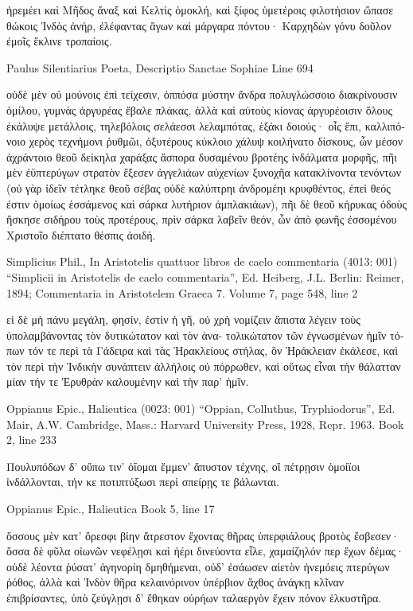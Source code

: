\documentclass[12pt,letterpaper,twoside,final]{memoir}
\begin{document}
\begin{greek}
ἠρεμέει καὶ Μῆδος ἄναξ καὶ Κελτὶς ὁμοκλή, 
καὶ ξίφος ὑμετέροις φιλοτήσιον ὤπασε θώκοις 
Ἰνδὸς ἀνήρ, ἐλέφαντας ἄγων καὶ μάργαρα πόντου· 
Καρχηδὼν γόνυ δοῦλον ἐμοῖς ἔκλινε τροπαίοις. 



Paulus Silentiarius Poeta, Descriptio Sanctae Sophiae 
Line 694

οὐδὲ μὲν οὐ μούνοις ἐπὶ τείχεσιν, ὁππόσα μύστην 
ἄνδρα πολυγλώσσοιο διακρίνουσιν ὁμίλου, 
γυμνὰς ἀργυρέας ἔβαλε πλάκας, ἀλλὰ καὶ αὐτοὺς 
κίονας ἀργυρέοισιν ὅλους ἐκάλυψε μετάλλοις, 
τηλεβόλοις σελάεσσι λελαμπότας, ἑξάκι δοιούς· 
οἷς ἔπι, καλλιπόνοιο χερὸς τεχνήμονι ῥυθμῶι, 
ὀξυτέρους κύκλοιο χάλυψ κοιλήνατο δίσκους, 
ὧν μέσον ἀχράντοιο θεοῦ δείκηλα χαράξας   
ἄσπορα δυσαμένου βροτέης ἰνδάλματα μορφῆς, 
πῆι μὲν ἐϋπτερύγων στρατὸν ἔξεσεν ἀγγελιάων 
αὐχενίων ξυνοχῆα κατακλίνοντα τενόντων 
(οὐ γὰρ ἰδεῖν τέτληκε θεοῦ σέβας οὐδὲ καλύπτρηι 
ἀνδρομέηι κρυφθέντος, ἐπεὶ θεός ἐστιν ὁμοίως 
ἑσσάμενος καὶ σάρκα λυτήριον ἀμπλακιάων), 
πῆι δὲ θεοῦ κήρυκας ὀδοὺς ἤσκησε σιδήρου 
τοὺς προτέρους, πρὶν σάρκα λαβεῖν θεόν, ὧν ἀπὸ φωνῆς 
ἐσσομένου Χριστοῖο διέπτατο θέσπις ἀοιδή. 



Simplicius Phil., In Aristotelis quattuor libros de caelo commentaria (4013: 001)
“Simplicii in Aristotelis de caelo commentaria”, Ed. Heiberg, J.L.
Berlin: Reimer, 1894; Commentaria in Aristotelem Graeca 7.
Volume 7, page 548, line 2

                εἰ δὲ μὴ πάνυ μεγάλη, φησίν, ἐστὶν ἡ γῆ, οὐ χρὴ 
νομίζειν ἄπιστα λέγειν τοὺς ὑπολαμβάνοντας τὸν δυτικώτατον καὶ τὸν ἀνα-  
τολικώτατον τῶν ἐγνωσμένων ἡμῖν τόπων τόν τε περὶ τὰ Γάδειρα καὶ τὰς 
Ἡρακλείους στήλας, ὃν Ἡράκλειαν ἐκάλεσε, καὶ τὸν περὶ τὴν Ἰνδικὴν 
συνάπτειν ἀλλήλοις οὐ πόρρωθεν, καὶ οὕτως εἶναι τὴν θάλατταν μίαν τήν 
τε Ἐρυθρὰν καλουμένην καὶ τὴν παρ' ἡμῖν. 



Oppianus Epic., Halieutica (0023: 001)
“Oppian, Colluthus, Tryphiodorus”, Ed. Mair, A.W.
Cambridge, Mass.: Harvard University Press, 1928, Repr. 1963.
Book 2, line 233

Πουλυπόδων δ' οὔπω τιν' ὀΐομαι ἔμμεν' ἄπυστον   
τέχνης, οἳ πέτρῃσιν ὁμοίϊοι ἰνδάλλονται, 
τήν κε ποτιπτύξωσι περὶ σπείρῃς τε βάλωνται. 



Oppianus Epic., Halieutica 
Book 5, line 17

ὅσσους μὲν κατ' ὄρεσφι βίην ἄτρεστον ἔχοντας 
θῆρας ὑπερφιάλους βροτὸς ἔσβεσεν· ὅσσα δὲ φῦλα 
οἰωνῶν νεφέλῃσι καὶ ἠέρι δινεύοντα 
εἷλε, χαμαίζηλόν περ ἔχων δέμας· οὐδὲ λέοντα 
ῥύσατ' ἀγηνορίη δμηθήμεναι, οὐδ' ἐσάωσεν   
αἰετὸν ἠνεμόεις πτερύγων ῥόθος, ἀλλὰ καὶ Ἰνδὸν 
θῆρα κελαινόρινον ὑπέρβιον ἄχθος ἀνάγκῃ 
κλῖναν ἐπιβρίσαντες, ὑπὸ ζεύγλῃσι δ' ἔθηκαν 
οὐρήων ταλαεργὸν ἔχειν πόνον ἑλκυστῆρα. 




\end{greek}
\end{document}
